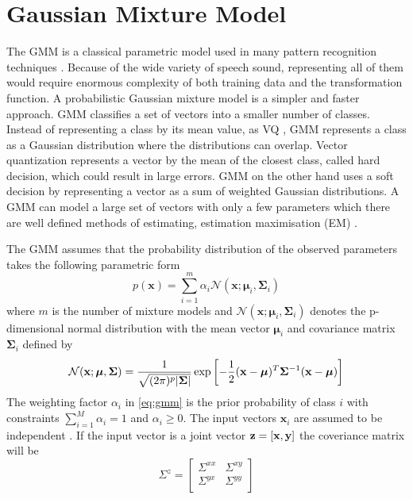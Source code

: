 \section{Gaussian Mixture Model} %
\label{sec:gaussian_mixture_model}
The GMM is a classical parametric model used in many pattern recognition techniques \cite{stylianou98}. Because of the wide variety of speech sound, representing all of them would require enormous complexity of both training data and the transformation function. A probabilistic Gaussian mixture model is a simpler and faster approach. GMM classifies a set of vectors into a smaller number of classes. Instead of representing a class by its mean value, as VQ , GMM represents a class as a Gaussian distribution where the distributions can overlap. Vector quantization represents a vector by the mean of the closest class, called hard decision, which could result in large errors. GMM on the other hand uses a soft decision by representing a vector as a sum of weighted Gaussian distributions. A GMM can model a large set of vectors with only a few parameters which there are well defined methods of estimating, \eg estimation maximisation (EM) \cite{taletek}.

The GMM assumes that the probability distribution of the observed parameters takes the following parametric form
\newcommand{\nnn}{\mathcal N}
\begin{equation}
	\label{eq:gmm}
	p(\mathbf{x}) = \sum_{i=1}^{m} \alpha_i \nnn(\mathbf{x}; \boldsymbol{\mu}_i, \mathbf{\Sigma}_i)
\end{equation}
where $m$ is the number of mixture models and $\nnn(\mathbf{x}; \boldsymbol{\mu}_i, \mathbf{\Sigma}_i)$ denotes the p-dimensional normal distribution \cite{statistikk} with the mean vector $\boldsymbol{\mu}_i$ and covariance matrix $\mathbf{\Sigma}_i$ defined by
\begin{equation}
	\nnn(\mathbf{x}; \boldsymbol{\mu}, \mathbf{\Sigma}) = \frac{1}{\sqrt{(2\pi)^p\abs{\mathbf{\Sigma}}}} \exp\sbrackets{-\frac{1}{2} (\mathbf{x} -\boldsymbol{\mu})^T \mathbf{\Sigma}^{-1} (\mathbf{x} -\boldsymbol{\mu})}
\end{equation}
The weighting factor $\alpha_i$ in \eqref{eq:gmm} is the prior probability of class $i$ with constraints $\sum_{i=1}^{M}\alpha_i = 1$ and $\alpha_i \geq 0$. The input vectors $\mathbf{x}_i$ are assumed to be independent \cite{stylianou98}. If the input vector is a joint vector $\mathbf{z}=\left[\mathbf{x},\mathbf{y}\right]$ the coveriance matrix will be
\begin{equation}
	\Sigma^z = \begin{bmatrix}
		\Sigma^{xx} & \Sigma^{xy} \\
		\Sigma^{yx} & \Sigma^{yy} \\
	\end{bmatrix}
\end{equation}

